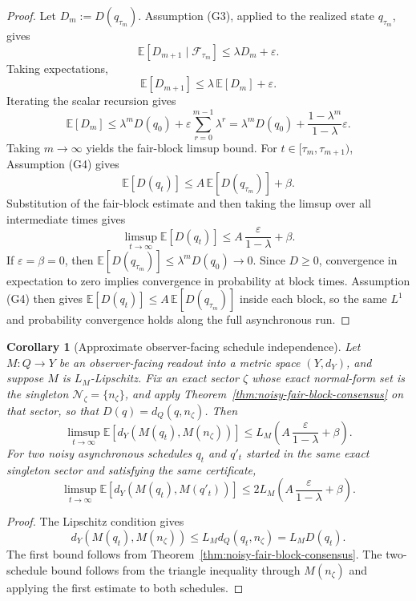 \documentclass[11pt]{article}
\newtheorem{corollary}[theorem]{Corollary}
\theoremstyle{remark}
\theoremstyle{plain}
\begin{document}
\begin{proof}
Let \(D_m:=D(q_{\tau_m})\). Assumption (G3), applied to the realized state \(q_{\tau_m}\), gives
\[
\mathbb E[D_{m+1}\mid \mathcal F_{\tau_m}]
\le
\lambda D_m+\varepsilon.
\]
Taking expectations,
\[
\mathbb E[D_{m+1}]
\le
\lambda\,\mathbb E[D_m]+\varepsilon.
\]
Iterating the scalar recursion gives
\[
\mathbb E[D_m]
\le
\lambda^mD(q_0)
+
\varepsilon\sum_{r=0}^{m-1}\lambda^r
=
\lambda^mD(q_0)
+
\frac{1-\lambda^m}{1-\lambda}\varepsilon.
\]
Taking \(m\to\infty\) yields the fair-block limsup bound. For
\(t\in[\tau_m,\tau_{m+1})\), Assumption (G4) gives
\[
\mathbb E[D(q_t)]
\le
A\,\mathbb E[D(q_{\tau_m})]+\beta.
\]
Substitution of the fair-block estimate and then taking the limsup over all intermediate times
gives
\[
\limsup_{t\to\infty}\mathbb E[D(q_t)]
\le
A\,\frac{\varepsilon}{1-\lambda}+\beta.
\]
If \(\varepsilon=\beta=0\), then \(\mathbb E[D(q_{\tau_m})]\le\lambda^mD(q_0)\to0\). Since
\(D\ge0\), convergence in expectation to zero implies convergence in probability at block times.
Assumption (G4) then gives \(\mathbb E[D(q_t)]\le A\,\mathbb E[D(q_{\tau_m})]\) inside each
block, so the same \(L^1\) and probability convergence holds along the full asynchronous run.
\end{proof}

\begin{corollary}[Approximate observer-facing schedule independence]
\label{cor:approx-schedule-independence}
Let \(M:Q\to Y\) be an observer-facing readout into a metric space \((Y,d_Y)\), and suppose \(M\)
is \(L_M\)-Lipschitz. Fix an exact sector \(\zeta\) whose exact normal-form set is the singleton
\(\mathcal N_\zeta=\{n_\zeta\}\), and apply Theorem~\ref{thm:noisy-fair-block-consensus} on that
sector, so that \(D(q)=d_Q(q,n_\zeta)\). Then
\[
\limsup_{t\to\infty}
\mathbb E\!\left[
d_Y(M(q_t),M(n_\zeta))
\right]
\le
L_M\left(A\,\frac{\varepsilon}{1-\lambda}+\beta\right).
\]
For two noisy asynchronous schedules \(q_t\) and \(q'_t\) started in the same exact singleton
sector and satisfying the same certificate,
\[
\limsup_{t\to\infty}
\mathbb E\!\left[
d_Y(M(q_t),M(q'_t))
\right]
\le
2L_M\left(A\,\frac{\varepsilon}{1-\lambda}+\beta\right).
\]
\end{corollary}

\begin{proof}
The Lipschitz condition gives
\[
d_Y(M(q_t),M(n_\zeta))
\le
L_M d_Q(q_t,n_\zeta)
=
L_M D(q_t).
\]
The first bound follows from Theorem~\ref{thm:noisy-fair-block-consensus}. The two-schedule bound
follows from the triangle inequality through \(M(n_\zeta)\) and applying the first estimate to
both schedules.
\end{proof}
\end{document}
